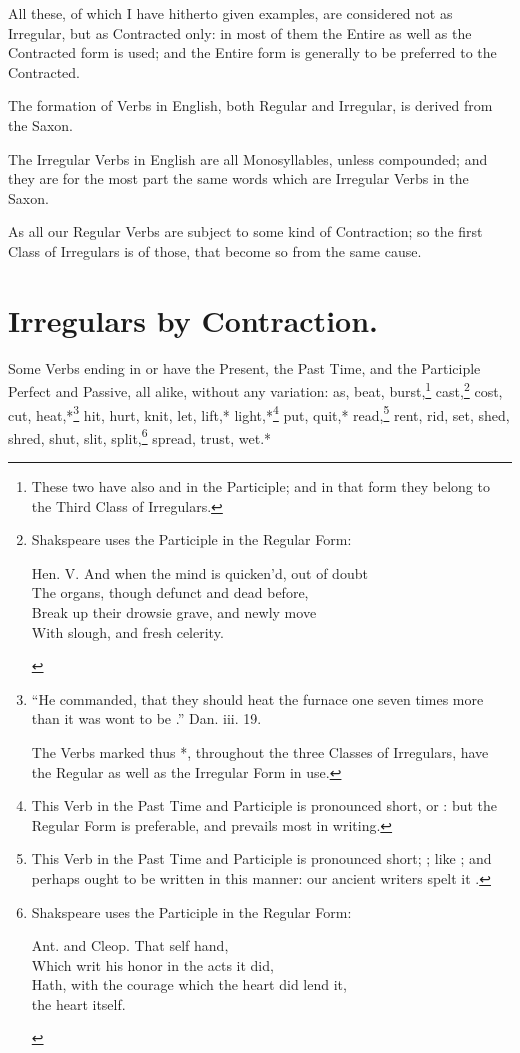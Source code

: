 All these, of which I have hitherto given examples, are considered not
as Irregular, but as Contracted only: in most of them the Entire as well
as the Contracted form is used; and the Entire form is generally to be
preferred to the Contracted.

The formation of Verbs in English, both Regular and Irregular, is
derived from the Saxon.

The Irregular Verbs in English are all Monosyllables, unless compounded;
and they are for the most part the same words which are Irregular Verbs
in the Saxon.

As all our Regular Verbs are subject to some kind of Contraction; so the
first Class of Irregulars is of those, that become so from the same
cause.

\section{Irregulars by Contraction.}

Some Verbs ending in  or  have the Present, the Past Time,
and the Participle Perfect and Passive, all alike, without any
variation: as, beat, burst,\footnote{These two have also  and
   in the Participle; and in that form they belong to the
  Third Class of Irregulars.} cast,\footnote{Shakspeare uses the
  Participle in the Regular Form:

  \begin{aquote}{Hen. V.}
    And when the mind is quicken'd, out of doubt\\
    The organs, though defunct and dead before,\\
    Break up their drowsie grave, and newly move\\
    With  slough, and fresh celerity.
  \end{aquote}} cost, cut, heat,*\footnote{``He commanded, that they
  should heat the furnace one seven times more than it was wont to be
  .'' Dan. iii. 19.

  The Verbs marked thus *, throughout the three Classes of Irregulars,
  have the Regular as well as the Irregular Form in use.
} hit, hurt, knit, let, lift,* light,*\footnote{This Verb in the Past
  Time and Participle is pronounced short,  or : but
  the Regular Form is preferable, and prevails most in writing.} put,
quit,* read,\footnote{This Verb in the Past Time and Participle is
  pronounced short; ; like ; and
  perhaps ought to be written in this manner: our ancient writers spelt
  it .} rent, rid, set, shed, shred, shut, slit,
split,\footnote{Shakspeare uses the Participle in the Regular Form:

  \begin{aquote}{Ant. and Cleop.}
    That self hand,\\
    Which writ his honor in the acts it did,\\
    Hath, with the courage which the heart did lend it,\\
     the heart itself.
  \end{aquote}} spread, trust, wet.*


